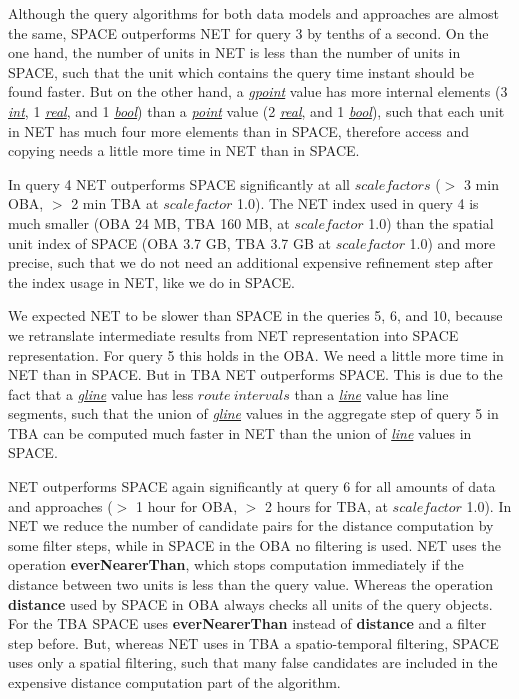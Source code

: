 \documentclass[a4paper]{article}
\newcommand{\op}[1]{\textbf{#1}}
\newcommand{\dt}[1]{\textsl{\underline{#1}}}
\begin{document}
Although the query algorithms for both data models and approaches are almost the
same, SPACE outperforms NET for query 3 by tenths of a second. On the one hand, the
number of units in NET is less than the number of units in SPACE,
such that the unit which contains the query time instant should be found faster.
But on the other hand, a \dt{gpoint} value has more internal elements (3 \dt{int},
1 \dt{real}, and 1 \dt{bool}) than a \dt{point} value (2 \dt{real}, and 1 \dt{bool}),
such that each unit in NET has much four more elements than in SPACE, therefore
access and copying needs a little more time in NET than in SPACE.

In query 4 NET outperforms SPACE significantly at all $scalefactors$ ($>$ 3 min OBA,
$>$ 2 min TBA at $scalefactor$ 1.0). The NET index used in query 4 is much smaller
(OBA 24 MB, TBA 160 MB, at $scalefactor$ 1.0) than the spatial unit index of SPACE
(OBA 3.7 GB, TBA 3.7 GB at $scalefactor$ 1.0) and more precise, such that we do not
need an additional expensive refinement step after the index usage in NET,
like we do in SPACE.

We expected NET to be slower than SPACE in the queries 5, 6, and 10, because
we retranslate intermediate results from NET representation into SPACE representation.
For query 5 this holds in the OBA. We need a little more time in NET
than in SPACE. But in TBA NET outperforms SPACE. This is due to the fact
that a \dt{gline} value has less $route\ intervals$
than a \dt{line} value has line segments,
such that the union of \dt{gline} values in the aggregate step of query 5 in
TBA can be computed much faster in NET than the union of \dt{line} values in SPACE.

NET outperforms SPACE again significantly at query 6
for all amounts of data and approaches ($>$ 1 hour for OBA, $>$
2 hours for TBA, at $scalefactor$ 1.0). In NET we reduce the number of candidate
pairs for the distance computation by some filter steps, while in SPACE
in the OBA no filtering is used. NET uses the operation \op{everNearerThan}, which
stops computation immediately if the distance between two units is less than the
query value. Whereas the operation \op{distance} used by SPACE in OBA always checks
all units of the query objects. For the TBA SPACE uses \op{everNearerThan}
instead of \op{distance} and a filter step before. But, whereas NET uses in TBA
a spatio-temporal filtering, SPACE uses only a spatial filtering, such that many
false candidates are included in the expensive distance computation part of the
algorithm.
\end{document}
